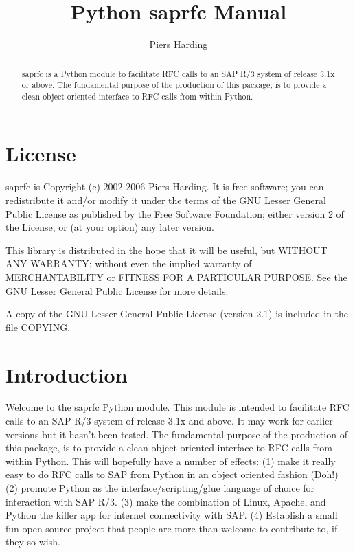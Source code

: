 \documentclass{howto}
\title{Python saprfc Manual}
\author{Piers Harding}
\begin{document}
\maketitle

\begin{abstract}
\noindent
saprfc is a Python module to facilitate RFC calls to an SAP R/3 system of 
release 3.1x or above.  The fundamental purpose of the production of this 
package, is to provide a clean object oriented interface to RFC calls from 
within Python.
\end{abstract}

\tableofcontents


\section{License \label{license}}

saprfc is Copyright (c) 2002-2006 Piers Harding.
It is free software; you can redistribute it and/or
modify it under the terms of the GNU Lesser General Public
License as published by the Free Software Foundation; either
version 2 of the License, or (at your option) any later version.

This library is distributed in the hope that it will be useful,
but WITHOUT ANY WARRANTY; without even the implied warranty of
MERCHANTABILITY or FITNESS FOR A PARTICULAR PURPOSE.  See the GNU
Lesser General Public License for more details.

A copy of the GNU Lesser General Public License (version 2.1) is included in
the file COPYING.


\section{Introduction \label{intro}}

Welcome to the saprfc Python module.  This module is intended to facilitate RFC calls to an SAP R/3 system of release 3.1x and above.  It may work for earlier versions but it hasn't been tested.
The fundamental purpose of the production of this package, is to provide a clean object oriented interface to RFC calls from within Python.  This will hopefully have a number of effects:
(1) make it really easy to do RFC calls to SAP from Python in an object oriented fashion (Doh!)
(2) promote Python as the interface/scripting/glue language of choice for interaction with SAP R/3.
(3) make the combination of Linux, Apache, and Python the killer app for internet connectivity with SAP.
(4) Establish a small fun open source project that people are more than welcome to contribute to, if they so wish.
\end{document}
